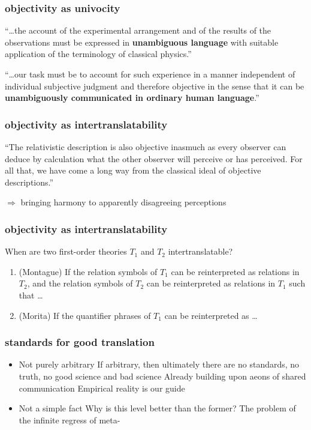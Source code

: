 \documentclass{beamer}
\begin{document}
\begin{frame}
  \frametitle{objectivity as univocity}

``\ldots the account of the experimental arrangement and of
  the results of the observations must be expressed in
  \textbf{unambiguous language} with suitable application of the
  terminology of classical physics.''

  \medskip ``\ldots our task must be to account for such experience in
  a manner independent of individual subjective judgment and therefore
  objective in the sense that it can be \textbf{unambiguously
    communicated in ordinary human language}.''

\end{frame}

\begin{frame}
  \frametitle{objectivity as intertranslatability}

  ``The relativistic description is also objective inasmuch as every
  observer can deduce by calculation what the other observer will
  perceive or has perceived.  For all that, we have come a long way
  from the classical ideal of objective descriptions.''

  \bigskip $\Longrightarrow$ bringing harmony to apparently
  disagreeing perceptions

\end{frame}

\begin{frame}
  \frametitle{objectivity as intertranslatability}

  When are two first-order theories $T_1$ and $T_2$ intertranslatable?

  \begin{enumerate}
  \item (Montague) If the relation symbols of $T_1$ can be reinterpreted as
    relations in $T_2$, and the relation symbols of $T_2$ can be
    reinterpreted as relations in $T_1$ such that \dots
  \item (Morita) If the quantifier phrases of $T_1$ can be
    reinterpreted as \dots
  \end{enumerate}


\end{frame}  

\begin{frame}
  \frametitle{standards for good translation}

  \begin{itemize}
  \item Not purely arbitrary \newline
    If arbitrary, then ultimately there are no standards, no truth, no
    good science and bad science  \newline
    Already building upon aeons of shared communication \newline
    Empirical reality is our guide 
  \item Not a simple fact \newline
    Why is this level better than the former? \newline
    The problem of the infinite regress of meta- 
  \end{itemize}
  
\end{frame}
\end{document}
